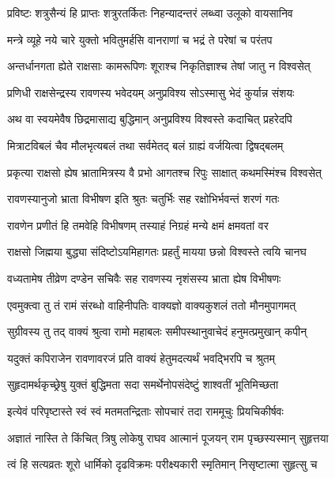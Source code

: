 \twolineshloka
{प्रविष्टः शत्रुसैन्यं हि प्राप्तः शत्रुरतर्कितः}
{निहन्यादन्तरं लब्ध्वा उलूको वायसानिव} %

\twolineshloka
{मन्त्रे व्यूहे नये चारे युक्तो भवितुमर्हसि}
{वानराणां च भद्रं ते परेषां च परंतप} %

\twolineshloka
{अन्तर्धानगता ह्येते राक्षसाः कामरूपिणः}
{शूराश्च निकृतिज्ञाश्च तेषां जातु न विश्वसेत्} %

\twolineshloka
{प्रणिधी राक्षसेन्द्रस्य रावणस्य भवेदयम्}
{अनुप्रविश्य सोऽस्मासु भेदं कुर्यान्न संशयः} %

\twolineshloka
{अथ वा स्वयमेवैष छिद्रमासाद्य बुद्धिमान्}
{अनुप्रविश्य विश्वस्ते कदाचित् प्रहरेदपि} %

\twolineshloka
{मित्राटविबलं चैव मौलभृत्यबलं तथा}
{सर्वमेतद् बलं ग्राह्यं वर्जयित्वा द्विषद्बलम्} %

\twolineshloka
{प्रकृत्या राक्षसो ह्येष भ्रातामित्रस्य वै प्रभो}
{आगतश्च रिपुः साक्षात् कथमस्मिंश्च विश्वसेत्} %

\twolineshloka
{रावणस्यानुजो भ्राता विभीषण इति श्रुतः}
{चतुर्भिः सह रक्षोभिर्भवन्तं शरणं गतः} %

\twolineshloka
{रावणेन प्रणीतं हि तमवेहि विभीषणम्}
{तस्याहं निग्रहं मन्ये क्षमं क्षमवतां वर} %

\twolineshloka
{राक्षसो जिह्मया बुद्ध्या संदिष्टोऽयमिहागतः}
{प्रहर्तुं मायया छन्नो विश्वस्ते त्वयि चानघ} %

\twolineshloka
{वध्यतामेष तीव्रेण दण्डेन सचिवैः सह}
{रावणस्य नृशंसस्य भ्राता ह्येष विभीषणः} %

\twolineshloka
{एवमुक्त्वा तु तं रामं संरब्धो वाहिनीपतिः}
{वाक्यज्ञो वाक्यकुशलं ततो मौनमुपागमत्} %

\twolineshloka
{सुग्रीवस्य तु तद् वाक्यं श्रुत्वा रामो महाबलः}
{समीपस्थानुवाचेदं हनुमत्प्रमुखान् कपीन्} %

\twolineshloka
{यदुक्तं कपिराजेन रावणावरजं प्रति}
{वाक्यं हेतुमदत्यर्थं भवद्भिरपि च श्रुतम्} %

\twolineshloka
{सुहृदामर्थकृच्छ्रेषु युक्तं बुद्धिमता सदा}
{समर्थेनोपसंदेष्टुं शाश्वतीं भूतिमिच्छता} %

\twolineshloka
{इत्येवं परिपृष्टास्ते स्वं स्वं मतमतन्द्रिताः}
{सोपचारं तदा राममूचुः प्रियचिकीर्षवः} %

\twolineshloka
{अज्ञातं नास्ति ते किंचित् त्रिषु लोकेषु राघव}
{आत्मानं पूजयन् राम पृच्छस्यस्मान् सुहृत्तया} %

\twolineshloka
{त्वं हि सत्यव्रतः शूरो धार्मिको दृढविक्रमः}
{परीक्ष्यकारी स्मृतिमान् निसृष्टात्मा सुहृत्सु च} %


